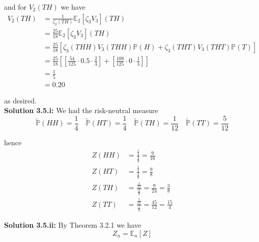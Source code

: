\documentclass[12pt]{article}
\renewcommand{\P}{\mathbb P}
\newcommand{\E}{\mathbb E}
\begin{document}
and for $V_2(TH)$ we have
\begin{align*}
	V_2(TH) &= \frac{1}{\zeta_2(TH)} \E_2[\zeta_3V_3](TH) \\
	&= \frac{25}{18} \E_2[\zeta_3V_3](TH) \\
	&= \frac{25}{18} \left[ \zeta_3(THH)V_3(THH) \P(H) + \zeta_3(THT)V_3(THT)\P(T) \right] \\
	&= \frac{25}{18} \left[ \left[ \frac{54}{125} \cdot 0.5 \cdot \frac{2}{3} \right] + \left[ \frac{108}{125} \cdot 0 \cdot \frac{1}{3} \right] \right] \\
	&= \frac{1}{5} \\
	&= 0.20
\end{align*}

as desired. \\

{\bf Solution 3.5.i:} We had the risk-neutral measure
\begin{equation*}
	\tilde{\P}(HH) = \frac{1}{4} \quad \tilde{\P}(HT) = \frac{1}{4} \quad \tilde{\P}(TH) = \frac{1}{12} \quad \tilde{\P}(TT) = \frac{5}{12}
\end{equation*}

hence
\begin{align*}
	Z(HH) &= \frac{ \frac{1}{4} }{ \frac{4}{9} } = \frac{9}{16} \\
	Z(HT) &= \frac{ \frac{1}{4} }{ \frac{2}{9} } = \frac{9}{8} \\
	Z(TH) &= \frac{ \frac{1}{12} }{ \frac{2}{9} } = \frac{9}{24} = \frac{3}{8} \\
	Z(TT) &= \frac{ \frac{5}{12} }{ \frac{1}{9} } = \frac{45}{12} = \frac{15}{4}
\end{align*}

{\bf Solution 3.5.ii:} By Theorem 3.2.1 we have
\begin{equation*}
	Z_n = \E_n[Z]
\end{equation*}
\end{document}
